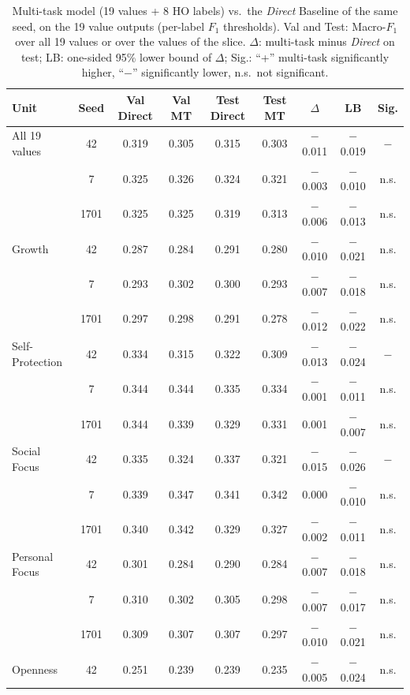 \begin{table}[!htbp]
\centering
\footnotesize
\caption{Multi-task model (19 values + 8 HO labels) vs.\ the \emph{Direct} Baseline of the same seed, on the 19 value outputs (per-label $F_1$ thresholds). Val and Test: Macro-$F_1$ over all 19 values or over the values of the slice. $\Delta$: multi-task minus \emph{Direct} on test; LB: one-sided 95\% lower bound of $\Delta$; Sig.: ``+'' multi-task significantly higher, ``$-$'' significantly lower, n.s.\ not significant.}
\label{tab:s8-multitask}
\begin{tabularx}{\textwidth}{Xcccccccc}
\hline
\textbf{Unit} & \textbf{Seed} & \textbf{Val Direct} & \textbf{Val MT} & \textbf{Test Direct} & \textbf{Test MT} & \textbf{$\Delta$} & \textbf{LB} & \textbf{Sig.} \\
\hline
All 19 values & 42 & 0.319 & 0.305 & 0.315 & 0.303 & $-$0.011 & $-$0.019 & $-$ \\
 & 7 & 0.325 & 0.326 & 0.324 & 0.321 & $-$0.003 & $-$0.010 & n.s. \\
 & 1701 & 0.325 & 0.325 & 0.319 & 0.313 & $-$0.006 & $-$0.013 & n.s. \\
Growth & 42 & 0.287 & 0.284 & 0.291 & 0.280 & $-$0.010 & $-$0.021 & n.s. \\
 & 7 & 0.293 & 0.302 & 0.300 & 0.293 & $-$0.007 & $-$0.018 & n.s. \\
 & 1701 & 0.297 & 0.298 & 0.291 & 0.278 & $-$0.012 & $-$0.022 & n.s. \\
Self-Protection & 42 & 0.334 & 0.315 & 0.322 & 0.309 & $-$0.013 & $-$0.024 & $-$ \\
 & 7 & 0.344 & 0.344 & 0.335 & 0.334 & $-$0.001 & $-$0.011 & n.s. \\
 & 1701 & 0.344 & 0.339 & 0.329 & 0.331 & 0.001 & $-$0.007 & n.s. \\
Social Focus & 42 & 0.335 & 0.324 & 0.337 & 0.321 & $-$0.015 & $-$0.026 & $-$ \\
 & 7 & 0.339 & 0.347 & 0.341 & 0.342 & 0.000 & $-$0.010 & n.s. \\
 & 1701 & 0.340 & 0.342 & 0.329 & 0.327 & $-$0.002 & $-$0.011 & n.s. \\
Personal Focus & 42 & 0.301 & 0.284 & 0.290 & 0.284 & $-$0.007 & $-$0.018 & n.s. \\
 & 7 & 0.310 & 0.302 & 0.305 & 0.298 & $-$0.007 & $-$0.017 & n.s. \\
 & 1701 & 0.309 & 0.307 & 0.307 & 0.297 & $-$0.010 & $-$0.021 & n.s. \\
Openness & 42 & 0.251 & 0.239 & 0.239 & 0.235 & $-$0.005 & $-$0.024 & n.s. \\

\end{tabularx}
\end{table}
